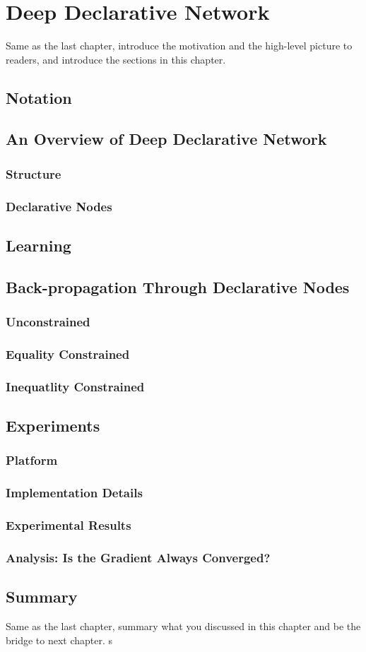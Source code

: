\chapter{Deep Declarative Network}
\label{cha:ddn}
Same as the last chapter, introduce the motivation and the high-level picture to
readers, and introduce the sections in this chapter.


\section{Notation}
\label{sec:des-hotpath}

\section{An Overview of Deep Declarative Network}
\subsection{Structure}
\subsection{Declarative Nodes}

\section{Learning}


\section{Back-propagation Through Declarative Nodes}

\subsection{Unconstrained}
\subsection{Equality Constrained}
\subsection{Inequatlity Constrained}

\section{Experiments}
\subsection{Platform}
\subsection{Implementation Details}
\subsection{Experimental Results}
\subsection{Analysis: Is the Gradient Always Converged?}



\section{Summary}
Same as the last chapter, summary what you discussed in this chapter and
be the bridge to next chapter.
s